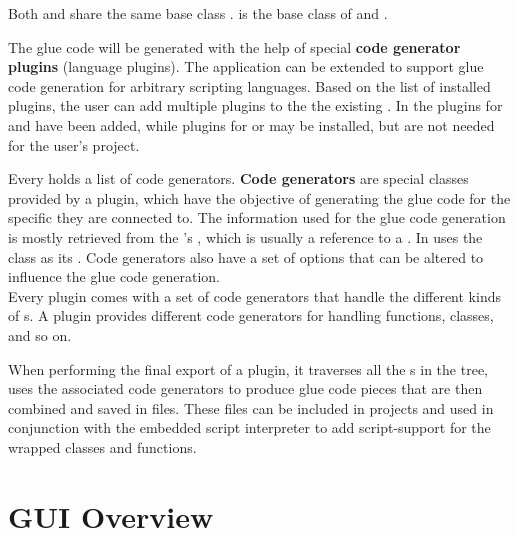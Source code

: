 Both  and  share the same base class .  is the base class of  and .

The glue code will be generated with the help of special \textbf{code generator plugins} (language plugins). The application can be extended to support glue code generation for arbitrary scripting languages. Based on the list of installed plugins, the user can add multiple plugins to the the existing . In  the plugins for  and  have been added, while plugins for  or  may be installed, but are not needed for the user's project.

Every  holds a list of code generators. \textbf{Code generators} are special classes provided by a plugin, which have the objective of generating the glue code for the specific  they are connected to. The information used for the glue code generation is mostly retrieved from the 's , which is usually a reference to a . In   uses the  class  as its . Code generators also have a set of options that can be altered to influence the glue code generation.\\
Every plugin comes with a set of code generators that handle the different kinds of s. A plugin provides different code generators for handling functions, classes, and so on. 

When performing the final export of a plugin, it traverses all the s in the tree, uses the associated code generators to produce glue code pieces that are then combined and saved in files. These files can be included in  projects and used in conjunction with the embedded script interpreter to add script-support for the wrapped classes and functions.

\newpage
\section{GUI Overview}

